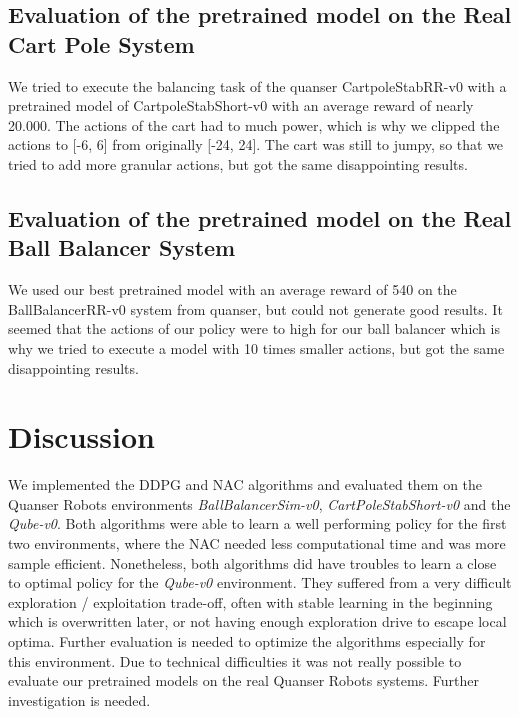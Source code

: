\subsection{Evaluation of the pretrained model on the Real Cart Pole System}
We tried to execute the balancing task of the quanser CartpoleStabRR-v0 with a pretrained model of CartpoleStabShort-v0 with an average reward of nearly 20.000. The actions of the cart had to much power, which is why we clipped the actions to [-6, 6] from originally [-24, 24]. The cart was still to jumpy, so that we tried to add more granular actions, but got the same disappointing results.

\subsection{Evaluation of the pretrained model on the Real Ball Balancer System}
We used our best pretrained model with an average reward of 540 on the BallBalancerRR-v0 system from quanser, but could not generate good results. It seemed that the actions of our policy were to high for our ball balancer which is why we tried to execute a model with 10 times smaller actions, but got the same disappointing results.


\section{Discussion}
We implemented the DDPG and NAC algorithms and evaluated them on the Quanser Robots environments \textit{BallBalancerSim-v0}, \textit{CartPoleStabShort-v0} and the \textit{Qube-v0}. Both algorithms were able to learn a well performing policy for the first two environments, where the NAC needed less computational time and was more sample efficient. Nonetheless, both algorithms did have troubles to learn a close to optimal policy for the \textit{Qube-v0} environment. They suffered from a very difficult exploration / exploitation trade-off, often with stable learning in the beginning which is overwritten later, or not having enough exploration drive to escape local optima. Further evaluation is needed to optimize the algorithms especially for this environment. Due to technical difficulties it was not really possible to evaluate our pretrained models on the real Quanser Robots systems. Further investigation is needed.
\label{sec:conclusion}






